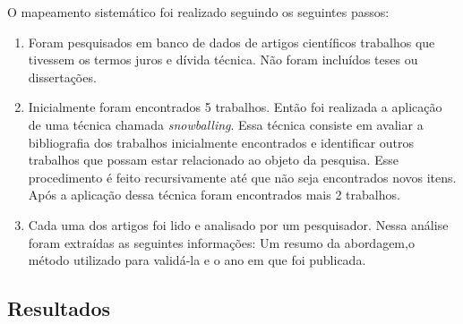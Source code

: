 O mapeamento sistemático foi realizado seguindo os seguintes passos:

\begin{enumerate}
\item Foram pesquisados em banco de dados de artigos científicos trabalhos que tivessem os termos juros e dívida técnica. Não foram incluídos teses ou dissertações.
\item Inicialmente foram encontrados 5 trabalhos. Então foi realizada a aplicação de uma técnica chamada \textit{snowballing}\cite{kruchten2013technical}. Essa técnica consiste em avaliar a bibliografia dos trabalhos inicialmente encontrados e identificar outros trabalhos que possam estar relacionado ao objeto da pesquisa. Esse procedimento é feito recursivamente até que não seja encontrados novos itens. Após a aplicação dessa técnica foram encontrados mais 2 trabalhos.
\item Cada uma dos artigos foi lido e analisado por um pesquisador. Nessa análise foram extraídas as seguintes informações: Um resumo da abordagem,o método utilizado para validá-la e o ano em que foi publicada.
\end{enumerate}

\subsection{Resultados}

